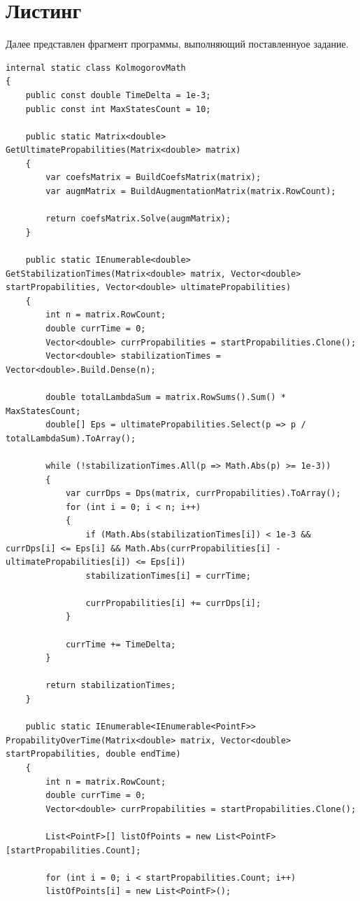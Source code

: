 \documentclass[12pt]{report}
\begin{document}
\section{Листинг}

Далее представлен фрагмент программы, выполняющий поставленнуое задание.

\begin{lstlisting}
internal static class KolmogorovMath
{
	public const double TimeDelta = 1e-3;
	public const int MaxStatesCount = 10;
	
	public static Matrix<double> GetUltimatePropabilities(Matrix<double> matrix)
	{
		var coefsMatrix = BuildCoefsMatrix(matrix);
		var augmMatrix = BuildAugmentationMatrix(matrix.RowCount);
		
		return coefsMatrix.Solve(augmMatrix);
	}
	
	public static IEnumerable<double> GetStabilizationTimes(Matrix<double> matrix, Vector<double> startPropabilities, Vector<double> ultimatePropabilities)
	{
		int n = matrix.RowCount;
		double currTime = 0;
		Vector<double> currPropabilities = startPropabilities.Clone();
		Vector<double> stabilizationTimes = Vector<double>.Build.Dense(n);
		
		double totalLambdaSum = matrix.RowSums().Sum() * MaxStatesCount;
		double[] Eps = ultimatePropabilities.Select(p => p / totalLambdaSum).ToArray();
		
		while (!stabilizationTimes.All(p => Math.Abs(p) >= 1e-3))
		{
			var currDps = Dps(matrix, currPropabilities).ToArray();
			for (int i = 0; i < n; i++)
			{
				if (Math.Abs(stabilizationTimes[i]) < 1e-3 && currDps[i] <= Eps[i] && Math.Abs(currPropabilities[i] - ultimatePropabilities[i]) <= Eps[i])
				stabilizationTimes[i] = currTime;
				
				currPropabilities[i] += currDps[i];
			}
			
			currTime += TimeDelta;
		}
		
		return stabilizationTimes;
	}
	
	public static IEnumerable<IEnumerable<PointF>> PropabilityOverTime(Matrix<double> matrix, Vector<double> startPropabilities, double endTime)
	{
		int n = matrix.RowCount;
		double currTime = 0;
		Vector<double> currPropabilities = startPropabilities.Clone();
		
		List<PointF>[] listOfPoints = new List<PointF>[startPropabilities.Count];
		
		for (int i = 0; i < startPropabilities.Count; i++)
		listOfPoints[i] = new List<PointF>();
		

\end{lstlisting}
\end{document}

